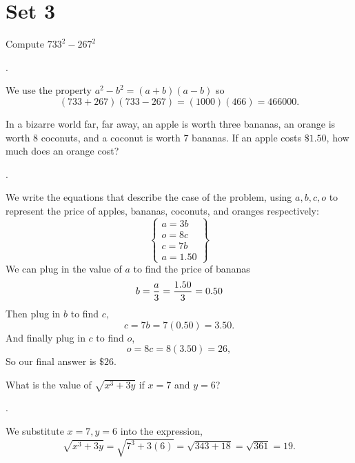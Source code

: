 \documentclass[11pt]{article}
\DeclareRobustCommand{\frac}[3][0pt]{%
  {\begingroup\hspace{#1}#2\hspace{#1}\endgroup\over\hspace{#1}#3\hspace{#1}}}
\begin{document}
\eject

\section*{Set 3}

\begin{problem}
Compute $733^2-267^2$
\end{problem}
\begin{answer}
.
\end{answer}
\begin{solution}
We use the property $a^2-b^2 = (a+b)(a-b)$ so
$$(733+267)(733-267) = (1000)(466) = \boxed{466000}.$$
\end{solution}

\begin{problem}In a bizarre world far, far away, an apple is worth three bananas, an orange is worth 8 coconuts, and a coconut is worth 7 bananas. If an apple costs $\$1.50$, how much does an orange cost?
\end{problem}
\begin{answer}
.
\end{answer}
\begin{solution}
We write the equations that describe the case of the problem, using $a, b, c, o$ to represent the price of apples, bananas, coconuts, and oranges respectively:
 \[
	\left\{
            	\begin{array}{ll}
              	a=3b\\
              	o=8c\\
              	c=7b \\
a=1.50
            	\end{array}
	\right\}
  \]
We can plug in the value of $a$ to find the price of bananas
$$b=\frac{a}{3} = \frac{1.50}{3} = 0.50$$
Then plug in $b$ to find $c,$
$$c=7b = 7(0.50) = 3.50.$$
And finally plug in $c$ to find $o$,
$$o=8c=8(3.50)=26,$$
So our final answer is $\boxed{\$ 26}$.
\end{solution}


\begin{problem}What is the value of $\sqrt{x^{3}+3y}$ if $x=7$ and $y=6$?
\end{problem}
\begin{answer}
.
\end{answer}
\begin{solution}
We substitute $x=7, y=6$ into the expression,
$$\sqrt{x^{3}+3y}=\sqrt{7^3+3(6)}=\sqrt{343+18}=\sqrt{361}=\boxed{19}.$$
\end{solution}
\end{document}
